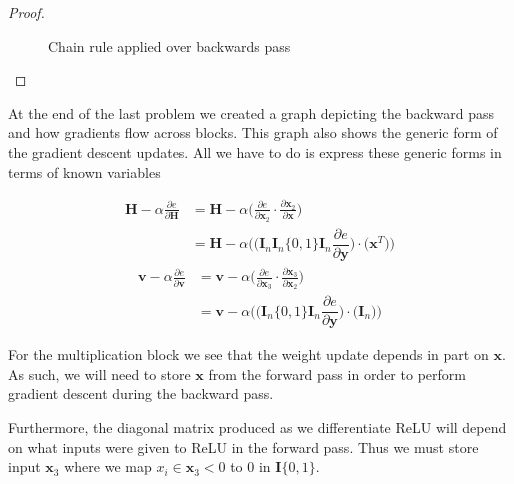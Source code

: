 \documentclass[11pt]{article}
\newcommand{\pd}{\partial}
\newcommand{\bs}{\boldsymbol}
\begin{document}
\begin{proof}
\begin{figure}[H]
	\caption{Chain rule applied over backwards pass}
	\end{figure}

\end{proof}



\begin{solution}
	At the end of the last problem we created a graph depicting the backward
	pass and how gradients flow across blocks. This graph also shows the
	generic form of the gradient descent updates. All we have to do is express
	these generic forms in terms of known variables

	\begin{align}
		\bs{H} - \alpha \frac{\pd e}{\pd \bs{H}}
		&= \bs{H} - \alpha \bigg(
			\frac{\pd e}{\pd \bs{x}_2}\cdot\frac{\pd\bs{x}_2}{\pd\bs{x}}
		\bigg)
		\\
		&= \bs{H} - \alpha \Bigg(
			\bigg(
				\bs{I}_n\bs{I}_n\{0, 1\}\bs{I}_n\dfrac{\pd e}{\pd\bs{y}}
			\bigg)
			\cdot
			\bigg(
				\bs{x}^T
			\bigg)
		\Bigg)
	\end{align}
	\begin{align}
		\bs{v} - \alpha \frac{\pd e}{\pd \bs{v}}
		&= \bs{v} - \alpha \bigg(
			\frac{\pd e}{\pd \bs{x}_3}\cdot\frac{\pd\bs{x}_3}{\pd\bs{x}_2}
		\bigg)
		\\
		&= \bs{v} - \alpha \Bigg(
			\bigg(
				\bs{I}_n\{0, 1\}\bs{I}_n\dfrac{\pd e}{\pd\bs{y}}
			\bigg)
			\cdot
			\bigg(
				\bs{I}_n
			\bigg)
		\Bigg)
	\end{align}

	For the multiplication block we see that the weight update depends in part on
	$\bs{x}$. As such, we will need to store $\bs{x}$ from the forward pass in
	order to perform gradient descent during the backward pass.

	Furthermore, the diagonal matrix produced as we differentiate ReLU will
	depend on what inputs were given to ReLU in the forward pass. Thus we must
	store input $\bs{x}_3$ where we map $x_i \in \bs{x}_3 < 0$ to $0$ in
	$\bs{I}\{0, 1\}$.

\end{solution}
\end{document}
